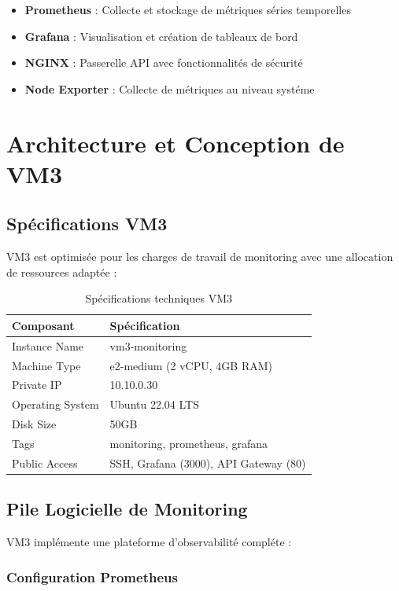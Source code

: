 \documentclass[12pt,a4paper]{report}
\begin{document}
\begin{itemize}
    \item \textbf{Prometheus} : Collecte et stockage de métriques séries temporelles
    \item \textbf{Grafana} : Visualisation et création de tableaux de bord
    \item \textbf{NGINX} : Passerelle API avec fonctionnalités de sécurité
    \item \textbf{Node Exporter} : Collecte de métriques au niveau systéme
\end{itemize}

\section{Architecture et Conception de VM3}

\subsection{Spécifications VM3}

VM3 est optimisée pour les charges de travail de monitoring avec une allocation de ressources adaptée :

\begin{table}[H]
\centering
\caption{Sp\'ecifications techniques VM3}
\label{tab:vm3-specs}
\begin{tabular}{@{}ll@{}}
\toprule
Composant & Sp\'ecification \\
\midrule
Instance Name & vm3-monitoring \\
Machine Type & e2-medium (2 vCPU, 4GB RAM) \\
Private IP & 10.10.0.30 \\
Operating System & Ubuntu 22.04 LTS \\
Disk Size & 50GB \\
Tags & monitoring, prometheus, grafana \\
Public Access & SSH, Grafana (3000), API Gateway (80) \\
\bottomrule
\end{tabular}
\end{table}

\subsection{Pile Logicielle de Monitoring}

VM3 implémente une plateforme d'observabilité compléte :

\subsubsection{Configuration Prometheus}
\end{document}
